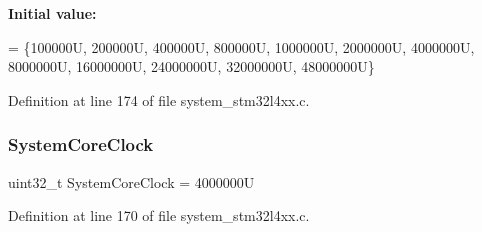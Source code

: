 {\bfseries Initial value\+:}
\begin{DoxyCode}
= \{100000U,   200000U,   400000U,   800000U,  1000000U,  2000000U, 
                                      4000000U, 8000000U, 16000000U, 24000000U, 32000000U, 48000000U\}
\end{DoxyCode}


Definition at line 174 of file system\+\_\+stm32l4xx.\+c.

\mbox{\label{group___s_t_m32_l4xx___system___private___variables_gaa3cd3e43291e81e795d642b79b6088e6}} 
\subsubsection{\texorpdfstring{System\+Core\+Clock}{SystemCoreClock}}
{\footnotesize\ttfamily uint32\+\_\+t System\+Core\+Clock = 4000000U}



Definition at line 170 of file system\+\_\+stm32l4xx.\+c.

